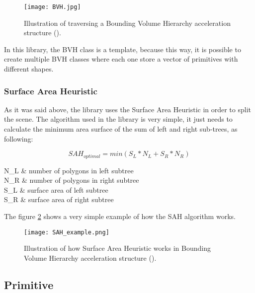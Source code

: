 \begin{figure}[H]
	\centering
	\caption{Illustration of traversing a Bounding Volume Hierarchy acceleration structure (\cite{BVH}).}
	\label{BVH.}
	\texttt{[image: BVH.jpg]}
\end{figure}

\par
In this library, the BVH class is a template, because this way, it is possible to create multiple BVH classes where each one store a vector of primitives with different shapes.

\subsubsection{Surface Area Heuristic}

\par
As it was said above, the library uses the Surface Area Heuristic in order to split the scene.
The algorithm used in the library is very simple, it just needs to calculate the minimum area surface of the sum of left and right sub-trees, as following:

\begin{equation}
SAH_{optimal} = min(S_L * N_L + S_R * N_R)
\end{equation}

\begin{conditions}
	N_L & number of polygons in left subtree \\
	N_R & number of polygons in right subtree \\
	S_L & surface area of left subtree \\
	S_R & surface area of right subtree \\
\end{conditions}

\par
The figure \ref{SAH.} shows a very simple example of how the SAH algorithm works.

\begin{figure}[H]
	\centering
	\caption{Illustration of how Surface Area Heuristic works in Bounding Volume Hierarchy acceleration structure (\cite{SAH}).}
	\label{SAH.}
	\texttt{[image: SAH\_example.png]}
\end{figure}

\subsection{Primitive}

